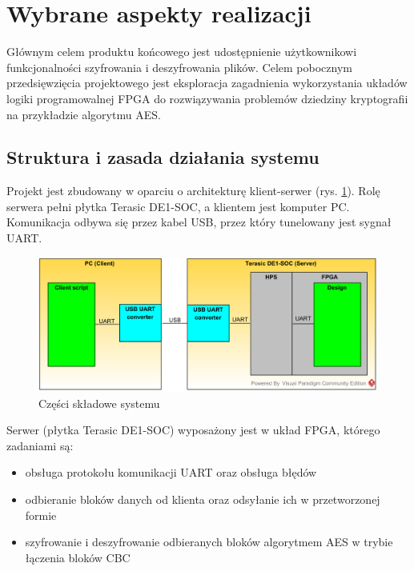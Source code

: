 \section{Wybrane aspekty realizacji}
\label{sec:wybrane-aspekty-realizacji}


Głównym celem produktu końcowego jest udostępnienie użytkownikowi funkcjonalności szyfrowania i deszyfrowania plików. Celem pobocznym przedsięwzięcia projektowego jest eksploracja zagadnienia wykorzystania układów logiki programowalnej FPGA do rozwiązywania problemów dziedziny kryptografii na przykładzie algorytmu AES.

\subsection {Struktura i zasada działania systemu}
Projekt jest zbudowany w oparciu o architekturę klient-serwer (rys. \ref{fig:system-architecture}). Rolę serwera pełni płytka Terasic DE1-SOC, a klientem jest komputer PC. Komunikacja odbywa się przez kabel USB, przez który tunelowany jest sygnał UART.

\begin{figure}[!h]
\includegraphics{pictures/system-architecture.png}
\caption{Części składowe systemu}
\label{fig:system-architecture}
\end{figure}

Serwer (płytka Terasic DE1-SOC) wyposażony jest w układ FPGA, którego zadaniami są:
\begin{itemize}
\item obsługa protokołu komunikacji UART oraz obsługa błędów
\item odbieranie bloków danych od klienta oraz odsyłanie ich w przetworzonej formie
\item szyfrowanie i deszyfrowanie odbieranych bloków algorytmem AES w trybie łączenia bloków CBC
\end{itemize}

